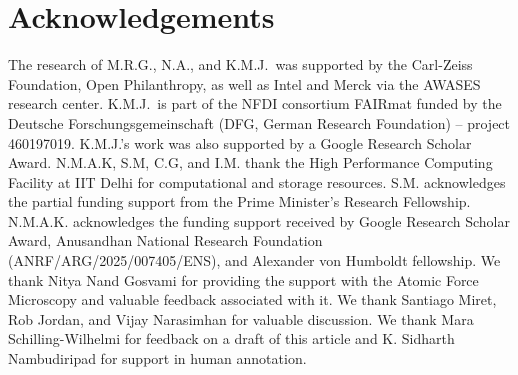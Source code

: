 \section*{Acknowledgements}

The research of M.R.G., N.A., and K.M.J.\ was supported by the Carl-Zeiss Foundation, Open Philanthropy, as well as Intel and Merck via the AWASES research center. K.M.J.\ is part of the NFDI consortium FAIRmat funded by the Deutsche Forschungsgemeinschaft (DFG, German Research Foundation) -- project 460197019. K.M.J.'s work was also supported by a Google Research Scholar Award. N.M.A.K, S.M, C.G, and I.M. thank the High Performance Computing Facility at IIT Delhi for computational and storage resources. S.M. acknowledges the partial funding support from the Prime Minister's Research Fellowship. N.M.A.K. acknowledges the funding support received by Google Research Scholar Award, Anusandhan National Research Foundation (ANRF/ARG/2025/007405/ENS), and Alexander von Humboldt fellowship. 
We thank Nitya Nand Gosvami for providing the support with the Atomic Force Microscopy and valuable feedback associated with it. We thank Santiago Miret, Rob Jordan, and Vijay Narasimhan for valuable discussion. We thank Mara Schilling-Wilhelmi for feedback on a draft of this article and K. Sidharth Nambudiripad for support in human annotation.